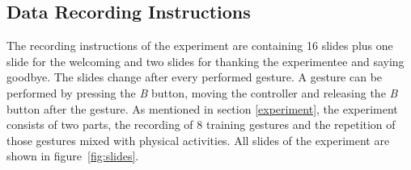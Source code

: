 \subsection{Data Recording Instructions} \label{data_recording_instructions}
The recording instructions of the experiment are containing 16 slides plus one slide for the welcoming and two slides
for thanking the experimentee and saying goodbye. The slides change after every performed gesture. A gesture can
be performed by pressing the \textit{B} button, moving the controller and releasing the \textit{B} button after the
gesture. As mentioned in section \ref{experiment}, the experiment consists of two parts, the recording of 8 training
gestures and the repetition of those gestures mixed with physical activities. All slides of the experiment are shown in
figure~\ref{fig:slides}.

